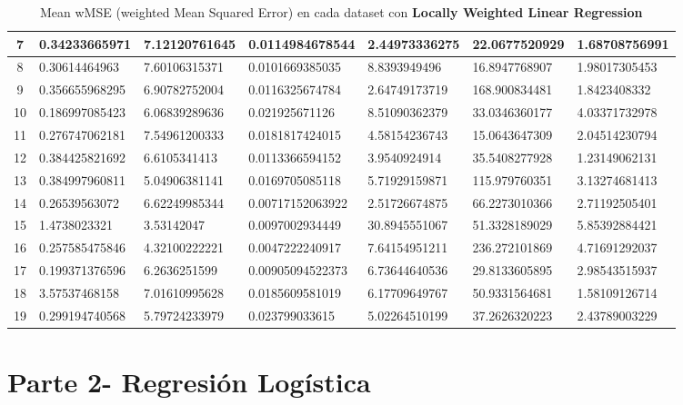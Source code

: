 \documentclass[spanish, fleqn]{article}
\begin{document}
\begin{enumerate}
\begin{table}[!htbp]
\begin{tabular}{|c|l|l|l|l|l|l|}
7  & 0.34233665971 & 7.12120761645 & 0.0114984678544 & 2.44973336275 & 22.0677520929 & 1.68708756991 \\ \hline
8  & 0.30614464963 & 7.60106315371 & 0.0101669385035 & 8.8393949496 & 16.8947768907 & 1.98017305453 \\ \hline
9  & 0.356655968295 & 6.90782752004 & 0.0116325674784 & 2.64749173719 & 168.900834481 & 1.8423408332 \\ \hline
10 & 0.186997085423 & 6.06839289636 & 0.021925671126 & 8.51090362379 & 33.0346360177 & 4.03371732978 \\ \hline
11 & 0.276747062181 & 7.54961200333 & 0.0181817424015 & 4.58154236743 & 15.0643647309 & 2.04514230794 \\ \hline
12 & 0.384425821692 & 6.6105341413 & 0.0113366594152 & 3.9540924914  & 35.5408277928 & 1.23149062131 \\ \hline
13 & 0.384997960811 & 5.04906381141 & 0.0169705085118 & 5.71929159871 & 115.979760351 & 3.13274681413 \\ \hline
14 & 0.26539563072 & 6.62249985344 & 0.00717152063922 & 2.51726674875 & 66.2273010366 & 2.71192505401 \\ \hline
15 & 1.4738023321 & 3.53142047 & 0.0097002934449 & 30.8945551067 & 51.3328189029 & 5.85392884421 \\ \hline
16 & 0.257585475846 & 4.32100222221 & 0.0047222240917 & 7.64154951211 & 236.272101869 & 4.71691292037 \\ \hline
17 & 0.199371376596 & 6.2636251599 & 0.00905094522373 & 6.73644640536 & 29.8133605895 & 2.98543515937 \\ \hline
18 & 3.57537468158 & 7.01610995628 & 0.0185609581019 & 6.17709649767 & 50.9331564681 & 1.58109126714 \\ \hline
19 & 0.299194740568 & 5.79724233979 & 0.023799033615 & 5.02264510199 & 37.2626320223 & 2.43789003229 \\ \hline
\end{tabular}
\caption{Mean wMSE (weighted Mean Squared Error) en cada dataset con \textbf{Locally Weighted Linear Regression}}
\label{my-label}
\end{table}





\end{enumerate}



\newpage
\section*{Parte 2- Regresión Logística}
\end{document}
